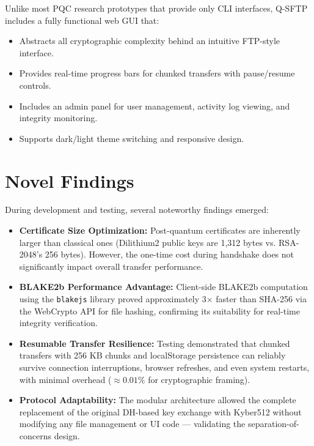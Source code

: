 Unlike most PQC research prototypes that provide only CLI interfaces, Q-SFTP includes a fully functional web GUI that:
\begin{itemize}
    \item Abstracts all cryptographic complexity behind an intuitive FTP-style interface.
    \item Provides real-time progress bars for chunked transfers with pause/resume controls.
    \item Includes an admin panel for user management, activity log viewing, and integrity monitoring.
    \item Supports dark/light theme switching and responsive design.
\end{itemize}

\section{Novel Findings}

During development and testing, several noteworthy findings emerged:

\begin{itemize}
    \item \textbf{Certificate Size Optimization:} Post-quantum certificates are inherently larger than classical ones (Dilithium2 public keys are 1,312 bytes vs. RSA-2048's 256 bytes). However, the one-time cost during handshake does not significantly impact overall transfer performance.
    
    \item \textbf{BLAKE2b Performance Advantage:} Client-side BLAKE2b computation using the \texttt{blakejs} library proved approximately 3$\times$ faster than SHA-256 via the WebCrypto API for file hashing, confirming its suitability for real-time integrity verification.
    
    \item \textbf{Resumable Transfer Resilience:} Testing demonstrated that chunked transfers with 256 KB chunks and localStorage persistence can reliably survive connection interruptions, browser refreshes, and even system restarts, with minimal overhead ($\approx 0.01\%$ for cryptographic framing).
    
    \item \textbf{Protocol Adaptability:} The modular architecture allowed the complete replacement of the original DH-based key exchange with Kyber512 without modifying any file management or UI code — validating the separation-of-concerns design.
\end{itemize}

